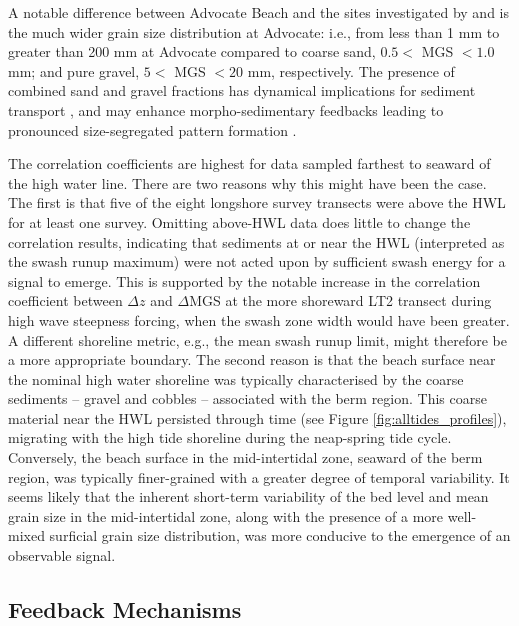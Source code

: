 \documentclass[jmse,article,submit,pdftex,moreauthors]{Definitions/mdpi}
\begin{document}
A notable difference between Advocate Beach and the sites investigated by \citet{Masselink_etal2007} and \citet{Austin_Buscombe2008} is the much wider grain size distribution at Advocate: i.e., from less than 1 mm to greater than 200 mm at Advocate compared to coarse sand, $0.5 <$ MGS $< 1.0$ mm; and pure gravel, $5 <$ MGS $< 20$ mm, respectively. The presence of combined sand and gravel fractions has dynamical implications for sediment transport \citep{Wilcock_McArdell1993, Wilcock_McArdell1997, Wilcock_Crowe2003}, and may enhance morpho-sedimentary feedbacks leading to pronounced size-segregated pattern formation \citep{LonguetHiggins_Parkin1962, Guest_Hay2019}. 

The correlation coefficients are highest for data sampled farthest to seaward of the high water line. There are two reasons why this might have been the case. The first is that five of the eight longshore survey transects were above the HWL for at least one survey. Omitting above-HWL data does little to change the correlation results, indicating that sediments at or near the HWL (interpreted as the swash runup maximum) were not acted upon by sufficient swash energy for a signal to emerge. This is supported by the notable increase in the correlation coefficient between $\Delta z$ and $\Delta$MGS at the more shoreward LT2 transect during high wave steepness forcing, when the swash zone width would have been greater. A different shoreline metric, e.g., the mean swash runup limit, might therefore be a more appropriate boundary. The second reason is that the beach surface near the nominal high water shoreline was typically characterised by the coarse sediments -- gravel and cobbles -- associated with the berm region. This coarse material near the HWL persisted through time (see Figure \ref{fig:alltides_profiles}), migrating with the high tide shoreline during the neap-spring tide cycle. Conversely, the beach surface in the mid-intertidal zone, seaward of the berm region, was typically finer-grained with a greater degree of temporal variability. It seems likely that the inherent short-term variability of the bed level and mean grain size in the mid-intertidal zone, along with the presence of a more well-mixed surficial grain size distribution, was more conducive to the emergence of an observable signal.


\subsection{Feedback Mechanisms}\label{Discussion:Feedback}
\end{document}
